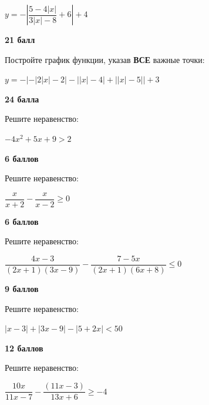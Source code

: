$y=-\left|\dfrac{5-4\left|x\right|}{3\left|x\right|-8}+6\right| + 4$

\begin{flushright} \textbf{21 балл}\\ 
\end{flushright}

 Постройте график функции, указав \textbf{ВСЕ} важные точки:

$y=-\left|-\left|2\left|x\right|-2\right|-\left|\left|x\right|-4\right|+\left|\left|x\right|-5\right|\right|+3$

\begin{flushright} \textbf{24 балла}\\ 
\end{flushright}

\newpage

 Решите неравенство:

$-4x^{2}+5x+9>2$

\begin{flushright} \textbf{6 баллов}\\ 
\end{flushright}

 Решите неравенство:

$\dfrac{x}{x+2}-\dfrac{x}{x-2}\geqslant0$

\begin{flushright} \textbf{6 баллов}\\ 
\end{flushright}

 Решите неравенство:

$\dfrac{4x-3}{\left(2x+1\right)\left(3x-9\right)}-\dfrac{7-5x}{\left(2x+1\right)\left(6x+8\right)}\le0$

\begin{flushright} \textbf{9 баллов}\\ 
\end{flushright}

 Решите неравенство:

$\left|x-3\right|+\left|3x-9\right|-\left|5+2x\right|<50$

\begin{flushright} \textbf{12 баллов}\\ 
\end{flushright}

 Решите неравенство:

$\dfrac{10x}{11x-7}-\dfrac{\left(11x-3\right)}{13x+6}\ge-4$

